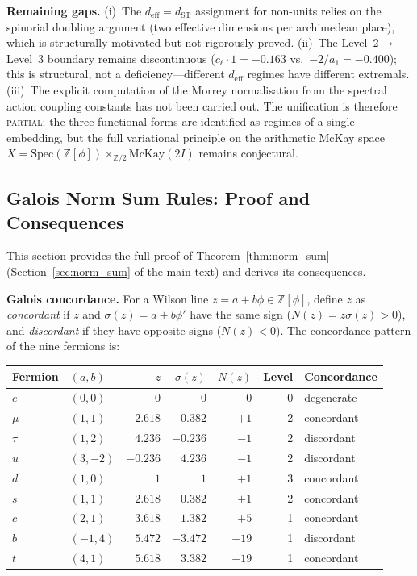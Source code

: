 \documentclass[12pt,a4paper]{article}
\theoremstyle{definition}
\begin{document}
\textbf{Remaining gaps.}  (i)~The $d_{\text{eff}} = d_{\text{ST}}$ assignment for non-units relies on the spinorial doubling argument (two effective dimensions per archimedean place), which is structurally motivated but not rigorously proved.  (ii)~The Level~2$\to$Level~3 boundary remains discontinuous ($c_\ell \cdot 1 = +0.163$ vs.\ $-2/a_1 = -0.400$); this is structural, not a deficiency---different $d_{\text{eff}}$ regimes have different extremals.  (iii)~The explicit computation of the Morrey normalisation from the spectral action coupling constants has not been carried out.  The unification is therefore \textsc{partial}: the three functional forms are identified as regimes of a single embedding, but the full variational principle on the arithmetic McKay space $X = \mathrm{Spec}(\mathbb{Z}[\phi]) \times_{\mathbb{Z}/2} \text{McKay}(2I)$ remains conjectural.

\subsection{Galois Norm Sum Rules: Proof and Consequences}
\label{sec:S-norm-sum}

This section provides the full proof of Theorem~\ref{thm:norm_sum} (Section~\ref{sec:norm_sum} of the main text) and derives its consequences.

\textbf{Galois concordance.}  For a Wilson line $z = a + b\phi \in \mathbb{Z}[\phi]$, define $z$ as \emph{concordant} if $z$ and $\sigma(z) = a + b\phi'$ have the same sign ($N(z) = z\sigma(z) > 0$), and \emph{discordant} if they have opposite signs ($N(z) < 0$).  The concordance pattern of the nine fermions is:

\begin{center}
\begin{tabular}{llrrrrl}
\toprule
\textbf{Fermion} & $(a,b)$ & $z$ & $\sigma(z)$ & $N(z)$ & \textbf{Level} & \textbf{Concordance} \\
\midrule
$e$ & $(0,0)$ & $0$ & $0$ & $0$ & 0 & degenerate \\
$\mu$ & $(1,1)$ & $2.618$ & $0.382$ & $+1$ & 2 & concordant \\
$\tau$ & $(1,2)$ & $4.236$ & $-0.236$ & $-1$ & 2 & discordant \\
$u$ & $(3,-2)$ & $-0.236$ & $4.236$ & $-1$ & 2 & discordant \\
$d$ & $(1,0)$ & $1$ & $1$ & $+1$ & 3 & concordant \\
$s$ & $(1,1)$ & $2.618$ & $0.382$ & $+1$ & 2 & concordant \\
$c$ & $(2,1)$ & $3.618$ & $1.382$ & $+5$ & 1 & concordant \\
$b$ & $(-1,4)$ & $5.472$ & $-3.472$ & $-19$ & 1 & discordant \\
$t$ & $(4,1)$ & $5.618$ & $3.382$ & $+19$ & 1 & concordant \\
\bottomrule
\end{tabular}
\end{center}
\end{document}
